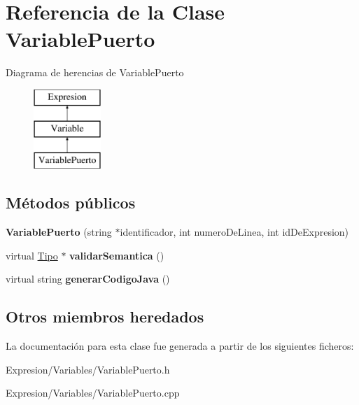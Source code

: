\hypertarget{class_variable_puerto}{\section{Referencia de la Clase Variable\-Puerto}
\label{class_variable_puerto}
}
Diagrama de herencias de Variable\-Puerto\begin{figure}[H]
\begin{center}
\leavevmode
\includegraphics[height=3.000000cm]{class_variable_puerto}
\end{center}
\end{figure}
\subsection*{Métodos públicos}
\begin{DoxyCompactItemize}
\item 
\hypertarget{class_variable_puerto_ac78e5498c57e753497e3275a2fd10f20}{{\bfseries Variable\-Puerto} (string $\ast$identificador, int numero\-De\-Linea, int id\-De\-Expresion)}\label{class_variable_puerto_ac78e5498c57e753497e3275a2fd10f20}

\item 
\hypertarget{class_variable_puerto_a9d32bc6ff4ccee041535fdc82c4d84c1}{virtual \hyperlink{class_tipo}{Tipo} $\ast$ {\bfseries validar\-Semantica} ()}\label{class_variable_puerto_a9d32bc6ff4ccee041535fdc82c4d84c1}

\item 
\hypertarget{class_variable_puerto_a4ff0fec94e6cb2e0ec0f2f6e830b57ff}{virtual string {\bfseries generar\-Codigo\-Java} ()}\label{class_variable_puerto_a4ff0fec94e6cb2e0ec0f2f6e830b57ff}

\end{DoxyCompactItemize}
\subsection*{Otros miembros heredados}


La documentación para esta clase fue generada a partir de los siguientes ficheros\-:\begin{DoxyCompactItemize}
\item 
Expresion/\-Variables/Variable\-Puerto.\-h\item 
Expresion/\-Variables/Variable\-Puerto.\-cpp\end{DoxyCompactItemize}
